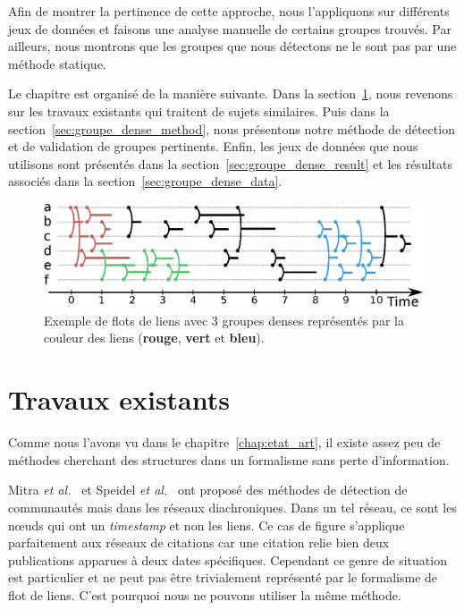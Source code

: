 Afin de montrer la pertinence de cette approche, nous l'appliquons sur différents jeux de données et faisons une analyse manuelle de certains groupes trouvés.
Par ailleurs, nous montrons que les groupes que nous détectons ne le sont pas par une méthode statique.

Le chapitre est organisé de la manière suivante.
Dans la section~\ref{sec:groupe_dense_existant}, nous revenons sur les travaux existants qui traitent de sujets similaires.
Puis dans la section~\ref{sec:groupe_dense_method}, nous présentons notre méthode de détection et de validation de groupes pertinents.
Enfin, les jeux de données que nous utilisons sont présentés dans la section~\ref{sec:groupe_dense_result} et les résultats associés dans la section~\ref{sec:groupe_dense_data}.

\begin{figure}
\centering
\includegraphics[width=\linewidth]{img/GroupeDense/GroupExample/Zone_dense.eps}
\caption{Exemple de flots de liens avec 3 groupes denses représentés par la couleur des liens (\textcolor{brique}{\textbf{rouge}}, \textcolor{vert_turquoise}{\textbf{vert}} et \textcolor{bleu_window}{\textbf{bleu}}).
}
\label{fig:exemple_groupe_dens}
\end{figure}

\section{Travaux existants}
\label{sec:groupe_dense_existant}

Comme nous l'avons vu dans le chapitre~\ref{chap:etat_art}, il existe assez peu de méthodes cherchant des structures dans un formalisme sans perte d'information.

Mitra \emph{et al.}~\cite{Mitra2012a} et Speidel \emph{et al.}~\cite{Speidel2015} ont proposé des méthodes de détection de communautés mais dans les réseaux diachroniques.
Dans un tel réseau, ce sont les n\oe{}uds qui ont un \emph{timestamp} et non les liens.
Ce cas de figure s'applique parfaitement aux réseaux de citations car une citation relie bien deux publications apparues à deux dates spécifiques.
Cependant ce genre de situation est particulier et ne peut pas être trivialement représenté par le formalisme de flot de liens.
C'est pourquoi nous ne pouvons utiliser la même méthode. 

